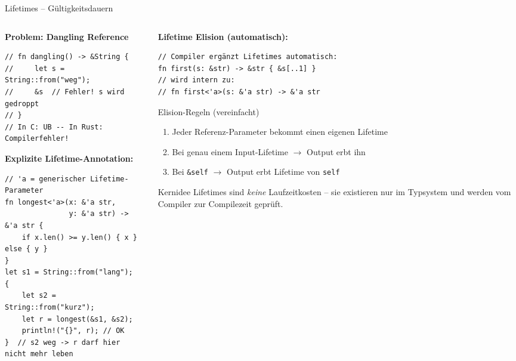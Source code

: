 \documentclass[%
  aspectratio=169,
  10pt
]{beamer}
\begin{document}
\begin{frame}[fragile]{Lifetimes -- Gültigkeitsdauern}
  \begin{columns}[T]
    \begin{column}{0.50\textwidth}
      \textbf{Problem: Dangling Reference}
\begin{lstlisting}
// fn dangling() -> &String {
//     let s = String::from("weg");
//     &s  // Fehler! s wird gedroppt
// }
// In C: UB -- In Rust: Compilerfehler!
\end{lstlisting}
      \textbf{Explizite Lifetime-Annotation:}
\begin{lstlisting}
// 'a = generischer Lifetime-Parameter
fn longest<'a>(x: &'a str,
               y: &'a str) -> &'a str {
    if x.len() >= y.len() { x } else { y }
}
let s1 = String::from("lang");
{
    let s2 = String::from("kurz");
    let r = longest(&s1, &s2);
    println!("{}", r); // OK
}  // s2 weg -> r darf hier nicht mehr leben
\end{lstlisting}
    \end{column}
    \begin{column}{0.47\textwidth}
      \textbf{Lifetime Elision (automatisch):}
\begin{lstlisting}
// Compiler ergänzt Lifetimes automatisch:
fn first(s: &str) -> &str { &s[..1] }
// wird intern zu:
// fn first<'a>(s: &'a str) -> &'a str
\end{lstlisting}
      \begin{block}{Elision-Regeln (vereinfacht)}
        \small
        \begin{enumerate}
          \item Jeder Referenz-Parameter bekommt
                einen eigenen Lifetime
          \item Bei genau einem Input-Lifetime
                $\to$ Output erbt ihn
          \item Bei \texttt{\&self} $\to$ Output
                erbt Lifetime von \texttt{self}
        \end{enumerate}
      \end{block}
      \begin{exampleblock}{Kernidee}
        \small Lifetimes sind \emph{keine} Laufzeitkosten --
        sie existieren nur im Typsystem und werden
        vom Compiler zur Compilezeit geprüft.
      \end{exampleblock}
    \end{column}
  \end{columns}
\end{frame}
\end{document}
